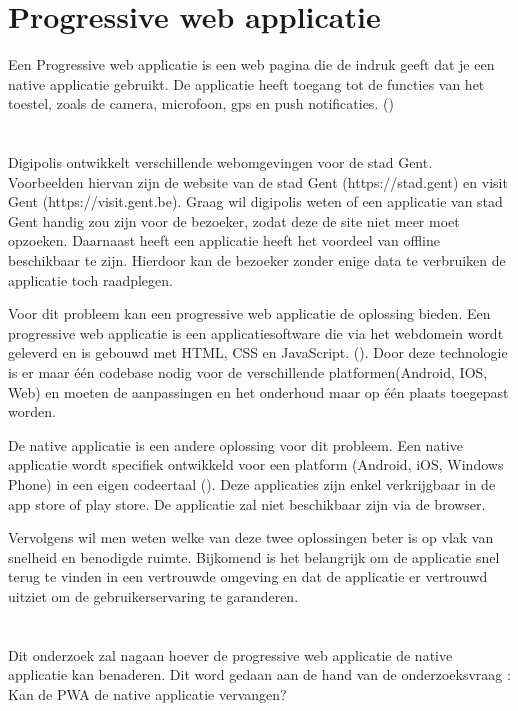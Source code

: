 \section{Progressive  web applicatie}
Een Progressive web applicatie is een web pagina die de indruk geeft dat je een native applicatie gebruikt. De applicatie heeft toegang tot de functies van het toestel, zoals de camera, microfoon, gps en push notificaties. (\cite{PWA_DEFINITIE})


\section{}
\label{sec:probleemstelling}

Digipolis ontwikkelt verschillende webomgevingen voor de stad Gent. Voorbeelden hiervan zijn de website van de stad Gent (https://stad.gent) en visit Gent (https://visit.gent.be). Graag wil digipolis weten of een applicatie van stad Gent handig zou zijn voor de bezoeker, zodat deze de site niet meer moet opzoeken. Daarnaast heeft een applicatie heeft het voordeel van offline beschikbaar te zijn. Hierdoor kan de bezoeker zonder enige data te verbruiken de applicatie toch raadplegen.

Voor dit probleem kan een progressive web applicatie de oplossing bieden. Een progressive web applicatie is een applicatiesoftware die via het webdomein wordt geleverd en is gebouwd met HTML, CSS en JavaScript. (\cite{DEFINITION_PWA}). Door deze technologie is er maar één codebase nodig voor de verschillende platformen(Android, IOS, Web) en moeten de aanpassingen en het onderhoud maar op één plaats toegepast worden.

De native applicatie is een andere oplossing voor dit probleem. Een native applicatie wordt specifiek ontwikkeld voor een platform (Android, iOS, Windows Phone) in een eigen codeertaal (\cite{DIFF_NATIVEAPP_PWA}). Deze applicaties zijn enkel verkrijgbaar in de app store of play store. De applicatie zal niet beschikbaar zijn via de browser.

Vervolgens wil men weten welke van deze twee oplossingen beter is op vlak van snelheid en benodigde ruimte. Bijkomend is het belangrijk om de applicatie snel terug te vinden in een vertrouwde omgeving en dat de applicatie er vertrouwd uitziet om de gebruikerservaring te garanderen.


\section{}
\label{sec:onderzoeksvraag}
Dit onderzoek zal nagaan hoever de progressive web applicatie de native applicatie kan benaderen. Dit word gedaan aan de hand van de onderzoeksvraag : Kan de PWA de native applicatie vervangen?

